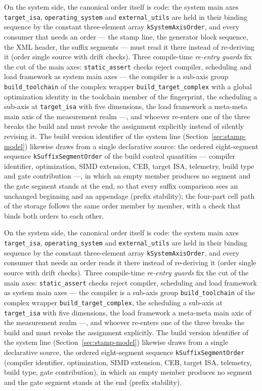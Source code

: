 \begin{nurlang}
On the system side, the canonical order itself is code: the system main axes \texttt{target\_isa},
\texttt{operating\_system} and \texttt{external\_utils} are held in their binding sequence by the
constant three-element array \texttt{kSystemAxisOrder}, and every consumer that needs an order --- the
stamp line, the generator block sequence, the XML header, the suffix segments --- must read it there
instead of re-deriving it (order single source with drift checks). Three compile-time \emph{re-entry
guards} fix the cut of the main axes: \texttt{static\_assert} checks reject compiler, scheduling and
load framework as system main axes --- the compiler is a sub-axis group \texttt{build\_toolchain} of
the complex wrapper \texttt{build\_target\_complex} with a global optimization identity in the
toolchain member of the fingerprint, the scheduling a sub-axis at \texttt{target\_isa} with five
dimensions, the load framework a meta-meta main axis of the measurement realm ---, and whoever
re-enters one of the three breaks the build and must revoke the assignment explicitly instead of
silently revising it. The build version identifier of the system line (Section~\ref{sec:stamp-model})
likewise draws from a single declarative source: the ordered eight-segment sequence
\texttt{kSuffixSegmentOrder} of the build control quantities --- compiler identifier, optimization,
SIMD extension, CEB, target ISA, telemetry, build type and gate contribution ---, in which an empty
member produces no segment and the gate segment stands at the end, so that every suffix comparison
sees an unchanged beginning and an appendage (prefix stability); the four-part cell path of the storage
follows the same order member by member, with a check that binds both orders to each other.
\end{nurlang}
\begin{nurkurz}
On the system side, the canonical order itself is code: the system main axes \texttt{target\_isa},
\texttt{operating\_system} and \texttt{external\_utils} are held in their binding sequence by the constant
three-element array \texttt{kSystemAxisOrder}, and every consumer that needs an order reads it there
instead of re-deriving it (order single source with drift checks). Three compile-time
\emph{re-entry guards} fix the cut of the main axes: \texttt{static\_assert} checks reject compiler,
scheduling and load framework as system main axes --- the compiler is a sub-axis group
\texttt{build\_toolchain} of the complex wrapper \texttt{build\_target\_complex}, the scheduling a
sub-axis at \texttt{target\_isa} with five dimensions, the load framework a meta-meta main axis of the
measurement realm ---, and whoever re-enters one of the three breaks the build and must revoke the
assignment explicitly. The build version identifier of the system line (Section~\ref{sec:stamp-model})
likewise draws from a single declarative source, the ordered eight-segment sequence
\texttt{kSuffixSegmentOrder} (compiler identifier, optimization, SIMD extension, CEB, target ISA,
telemetry, build type, gate contribution), in which an empty member produces no segment and the gate
segment stands at the end (prefix stability).
\end{nurkurz}

